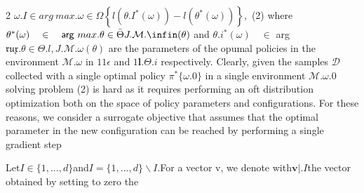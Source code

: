 \documentclass{article}
\begin{document}
\begin{paracol}{2}
$\omega . { I } \in a r g ~ m a x . { \omega \in \Omega } \left \{ l ( \theta . { I } ^ { * } ( \omega ) ) - l ( \theta ^ { * } ( \omega ) ) \right \},$ (2)
where $\theta ^ { * } ( \omega ) \quad \in \quad \mathsf { a r g } ~ m a x . { \theta \in \bar { \Theta } } J . { \mathcal { M } . { \infin } } ( \theta )$ and $\theta . { i } ^ { * } ( \omega ) \quad \in$
arg$\mathfrak { r u x } . { \theta \in \Theta . { l } }, J . { \mathcal { M } . { \omega } } ( \theta )$ are the parameters of the opumal
policies in the environment $\mathcal { M } . { \omega }$ in $1 1 \epsilon$ and $1 \mathbf { l } . { \Theta . { i } }$ respectively. Clearly, given the samples $\mathcal { D }$ collected with a single optimal policy $\pi ^ { * } \{ \omega . { 0 } \}$ in a single environment $\mathcal { M } . { \omega . { 0 } }$
solving problem (2) is hard as it requires performing an oft
distribution optimization both on the space of policy parameters and configurations. For these reasons, we consider a
surrogate objective that assumes that the optimal parameter
in the new configuration can be reached by performing a single gradient step


Let$I \in \{ 1,..., d \}$and$I = \{ 1,..., d \} \backslash I.$For a vector v, we
denote with$\mathbf { v } | . { I }$the vector obtained by setting to zero the

\end{paracol}
\end{document}
